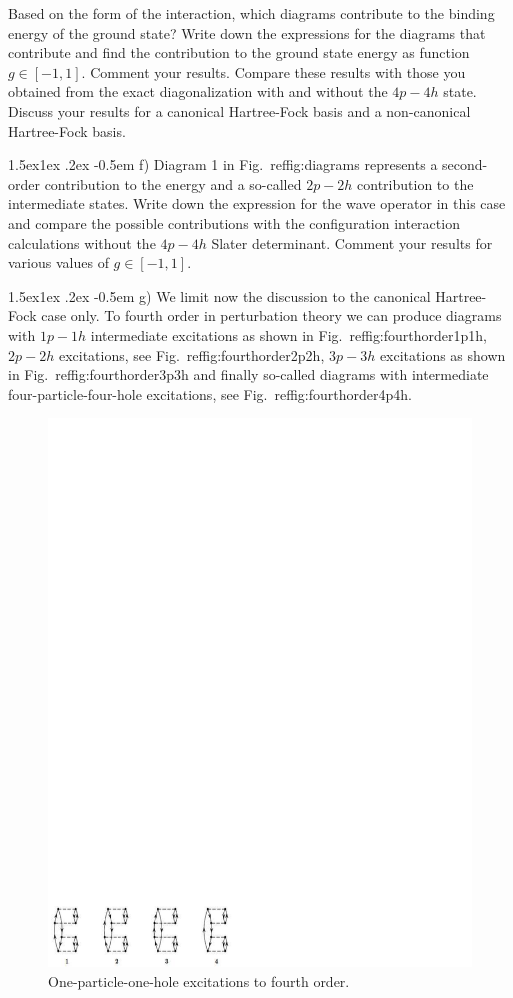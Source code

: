 \documentclass[%
twoside,                 %
final,                   %
10pt]{article}
\makeatletter
\newenvironment{doconceexercise}{}{}
\newcommand\subex{\@startsection{paragraph}{4}{\z@}%
                  {1.5ex\@plus1ex \@minus.2ex}%
                  {-0.5em}%
                  {\normalfont\normalsize\bfseries}}
\makeatother
\begin{document}
\begin{doconceexercise}
Based on the form of the interaction, which diagrams contribute to the
binding energy of the ground state?  Write down the expressions for
the diagrams that contribute and find the contribution to the ground
state energy as function $g\in [-1,1]$. Comment your results.  Compare
these results with those you obtained from the exact diagonalization with and without the $4p-4h$ state.
Discuss your results for a canonical Hartree-Fock basis and a non-canonical Hartree-Fock basis.

\subex{f)}
Diagram 1 in Fig.~ref{fig:diagrams} represents a second-order contribution to the energy and a so-called $2p-2h$ contribution to the intermediate states. Write down the expression for the wave operator in this case and compare the possible contributions with the configuration interaction calculations without the $4p-4h$ Slater determinant. Comment your results for 
various values of $g\in [-1,1]$.

\subex{g)}
We limit now the discussion to the canonical Hartree-Fock case only. To fourth order in perturbation theory we can produce diagrams with $1p-1h$ intermediate excitations as shown in Fig.~ref{fig:fourthorder1p1h}, $2p-2h$ excitations, see Fig.~ref{fig:fourthorder2p2h}, $3p-3h$ excitations as shown in Fig.~ref{fig:fourthorder3p3h} and finally so-called diagrams with intermediate four-particle-four-hole excitations, see Fig.~ref{fig:fourthorder4p4h}. 


\begin{figure}[t]
  \centerline{\includegraphics[width=0.6\linewidth]{fig-proj/1p1h.pdf}}
  \caption{
  One-particle-one-hole excitations to fourth order. \label{fig:fourthorder1p1h}
  }
\end{figure}




\end{doconceexercise}
\end{document}
